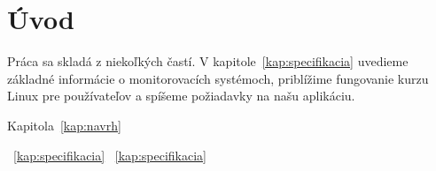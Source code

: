 \chapter*{Úvod} %



Práca sa skladá z niekoľkých častí. V kapitole~\ref{kap:specifikacia} uvedieme základné
informácie o monitorovacích systémoch, priblížime fungovanie kurzu Linux pre používateľov
a spíšeme požiadavky na našu aplikáciu.

Kapitola~\ref{kap:navrh} 

~\ref{kap:specifikacia}
~\ref{kap:specifikacia}